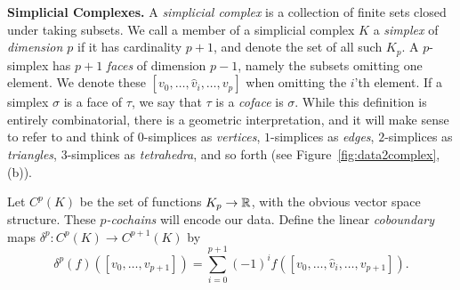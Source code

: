\textbf{Simplicial Complexes.} A \emph{simplicial complex} is a collection of finite sets closed under taking subsets. We call a member of a simplicial complex $K$ a \emph{simplex} of \emph{dimension $p$} if it has cardinality $p+1$, and denote the set of all such $K_p$. A $p$-simplex has $p+1$ \emph{faces} of dimension $p-1$, namely the subsets omitting one element. We denote these $[v_0,\dotsc,\hat{v}_i,\dotsc, v_p]$ when omitting the $i$'th element. If a simplex $\sigma$ is a face of $\tau$, we say that $\tau$ is a \emph{coface} is $\sigma$. While this definition is entirely combinatorial, there is a geometric interpretation, and it will make sense to refer to and think of $0$-simplices as \emph{vertices}, $1$-simplices as \emph{edges}, $2$-simplices as \emph{triangles}, $3$-simplices as \emph{tetrahedra}, and so forth (see Figure~\ref{fig:data2complex}, (b)).

Let $C^p(K)$ be the set of functions $K_p\to\mathbb{R}$, with the obvious vector space structure. These \emph{$p$-cochains} will encode our data. Define the linear \emph{coboundary} maps $\delta^p:C^p(K)\to C^{p+1}(K)$ by
\begin{equation*}
\delta^p(f)([v_0,\dotsc,v_{p+1}]) = \sum_{i=0}^{p+1} (-1)^i f([v_0,\dotsc,\hat{v}_i,\dotsc,v_{p+1}]).
\end{equation*}

